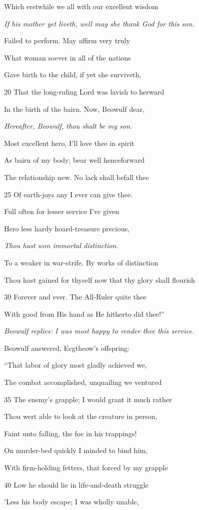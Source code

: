 Which erstwhile we all with our excellent wisdom

\emph{If his mother yet
liveth, well may
she thank God for
this son.}

Failed to perform. May affirm very truly

What woman soever in all of the nations

Gave birth to the child, if yet she surviveth,

20
That the long-ruling Lord was lavish to herward

In the birth of the bairn. Now, Beowulf dear,

\emph{Hereafter, Beowulf,
thou shalt be
my son.}

Most excellent hero, I’ll love thee in spirit

As bairn of my body; bear well henceforward

The relationship new. No lack shall befall thee

25
Of earth-joys any I ever can give thee.

Full often for lesser service I’ve given

Hero less hardy hoard-treasure precious,

\emph{Thou hast won immortal
distinction.}

To a weaker in war-strife. By works of distinction

Thou hast gained for thyself now that thy glory shall flourish

30
Forever and ever. The All-Ruler quite thee

With good from His hand as He hitherto did thee!”

\emph{Beowulf replies:
I was most happy
to render thee this
service.}

Beowulf answered, Ecgtheow’s offspring:

“That labor of glory most gladly achieved we,

The combat accomplished, unquailing we ventured

35
The enemy’s grapple; I would grant it much rather

Thou wert able to look at the creature in person,

Faint unto falling, the foe in his trappings!

On murder-bed quickly I minded to bind him,

With firm-holding fetters, that forced by my grapple

40
Low he should lie in life-and-death struggle

’Less his body escape; I was wholly unable,

